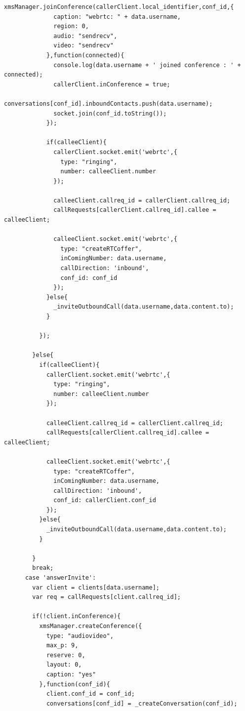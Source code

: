 \begin{appendices}
\begin{lstlisting}[caption={socket.js on Application Server},label={code:server_socket}]
            xmsManager.joinConference(callerClient.local_identifier,conf_id,{
              caption: "webrtc: " + data.username,
              region: 0,
              audio: "sendrecv",
              video: "sendrecv"
            },function(connected){
              console.log(data.username + ' joined conference : ' + connected);
              callerClient.inConference = true;
              conversations[conf_id].inboundContacts.push(data.username);
              socket.join(conf_id.toString());
            });

            if(calleeClient){
              callerClient.socket.emit('webrtc',{
                type: "ringing",
                number: calleeClient.number
              });

              calleeClient.callreq_id = callerClient.callreq_id;
              callRequests[callerClient.callreq_id].callee = calleeClient;

              calleeClient.socket.emit('webrtc',{
                type: "createRTCoffer",
                inComingNumber: data.username,
                callDirection: 'inbound',
                conf_id: conf_id
              });
            }else{
              _inviteOutboundCall(data.username,data.content.to);
            }   
            
          });

        }else{
          if(calleeClient){
            callerClient.socket.emit('webrtc',{
              type: "ringing",
              number: calleeClient.number
            });

            calleeClient.callreq_id = callerClient.callreq_id;
            callRequests[callerClient.callreq_id].callee = calleeClient;

            calleeClient.socket.emit('webrtc',{
              type: "createRTCoffer",
              inComingNumber: data.username,
              callDirection: 'inbound',
              conf_id: callerClient.conf_id
            });
          }else{
            _inviteOutboundCall(data.username,data.content.to);
          }
          
        }
        break;
      case 'answerInvite':
        var client = clients[data.username];
        var req = callRequests[client.callreq_id];

        if(!client.inConference){
          xmsManager.createConference({
            type: "audiovideo",
            max_p: 9,
            reserve: 0,
            layout: 0,
            caption: "yes"
          },function(conf_id){
            client.conf_id = conf_id;
            conversations[conf_id] = _createConversation(conf_id);


\end{lstlisting}
\end{appendices}
